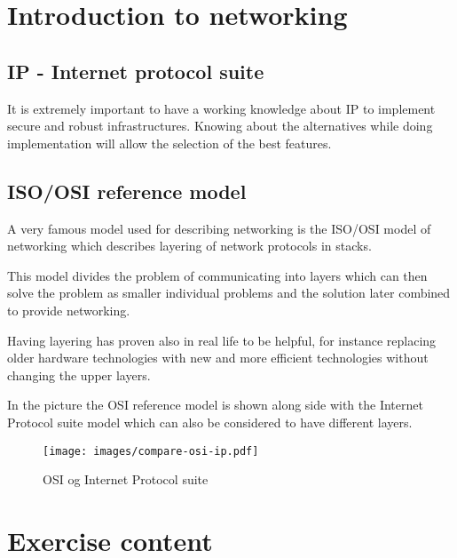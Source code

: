\documentclass[a4paper,11pt,notitlepage]{report}
\begin{document}
\chapter*{\color{titlecolor}Introduction to networking}
\label{chap:intro}

\section*{\color{titlecolor}IP - Internet protocol suite}

It is extremely important to have a working knowledge about IP to implement
secure and robust infrastructures. Knowing about the alternatives while doing
implementation will allow the selection of the best features.

\section*{\color{titlecolor}ISO/OSI reference model}
A very famous model used for describing networking is the ISO/OSI model
of networking which describes layering of network protocols in stacks.

This model divides the problem of communicating into layers which can
then solve the problem as smaller individual problems and the solution
later combined to provide networking.

Having layering has proven also in real life to be helpful, for instance
replacing older hardware technologies with new and more efficient technologies
without changing the upper layers.

In the picture the OSI reference model is shown along side with
the Internet Protocol suite model which can also be considered to have different layers.


\begin{figure}[H]
\label{fig:osi}
\begin{center}
\colorbox{white}{\texttt{[image: images/compare-osi-ip.pdf]}}
\end{center}
\caption{OSI og Internet Protocol suite}
\end{figure}


\chapter*{\color{titlecolor}Exercise content}
\end{document}
